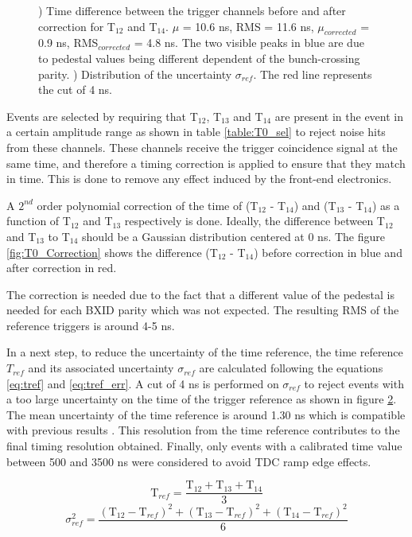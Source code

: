 \begin{figure}[htbp!]
\begin{subfigure}[t]{0.5\textwidth}
		\caption{} \label{fig:T0ReferenceError}
	\end{subfigure}
	\caption{) Time difference between the trigger channels before and after correction for T$_{12}$ and T$_{14}$. $\mu$ = 10.6 ns, RMS = 11.6 ns, $\mu_{corrected}$ = 0.9 ns, RMS$_{corrected}$ = 4.8 ns. The two visible peaks in blue are due to pedestal values being different dependent of the bunch-crossing parity. ) Distribution of the uncertainty $\sigma_{ref}$. The red line represents the cut of 4 ns.}
\end{figure}

Events are selected by requiring that T$_{12}$, T$_{13}$ and T$_{14}$ are present in the event in a certain amplitude range as shown in table \ref{table:T0_sel} to reject noise hits from these channels. These channels receive the trigger coincidence signal at the same time, and therefore a timing correction is applied to ensure that they match in time. This is done to remove any effect induced by the front-end electronics.

A $2^{nd}$ order polynomial correction of the time of (T$_{12}$ - T$_{14}$) and (T$_{13}$ - T$_{14}$) as a function of T$_{12}$ and T$_{13}$ respectively is done. Ideally, the difference between T$_{12}$ and T$_{13}$ to T$_{14}$ should be a Gaussian distribution centered at 0 ns. The figure \ref{fig:T0_Correction} shows the difference (T$_{12}$ - T$_{14}$) before correction in blue and after correction in red.

The correction is needed due to the fact that a different value of the pedestal is needed for each BXID parity which was not expected. The resulting RMS of the reference triggers is around 4-5 ns.

In a next step, to reduce the uncertainty of the time reference, the time reference $T_{ref}$ and its associated uncertainty $\sigma_{ref}$ are calculated following the equations \ref{eq:tref} and \ref{eq:tref_err}. A cut of 4 ns is performed on $\sigma_{ref}$ to reject events with a too large uncertainty on the time of the trigger reference as shown in figure \ref{fig:T0ReferenceError}. The mean uncertainty of the time reference is around 1.30 ns which is compatible with previous results \cite{Laurien2016}. This resolution from the time reference contributes to the final timing resolution obtained. Finally, only events with a calibrated time value between 500 and 3500 ns were considered to avoid TDC ramp edge effects.

\begin{equation} \label{eq:tref}
	\text{T}_{ref} = \frac{\text{T}_{12} + \text{T}_{13} + \text{T}_{14}}{3}
\end{equation}
\begin{equation} \label{eq:tref_err}
	\sigma_{ref}^2 = \frac{ (\text{T}_{12} - \text{T}_{ref})^2 + (\text{T}_{13} - \text{T}_{ref})^2  + (\text{T}_{14} - \text{T}_{ref})^2 }{6}
\end{equation}

